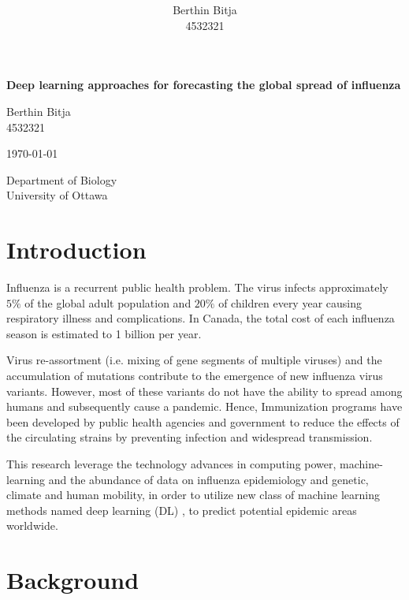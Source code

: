 \documentclass[12pt]{article}
\title{ }
\author{Berthin Bitja \\ 4532321}
\date{}
\begin{document}
\begin{titlepage}
	\centering

	{\Large\bfseries Deep learning approaches for forecasting the global spread of influenza \par}
	\vspace{2cm}
	{\small Berthin Bitja \\ 4532321 \par}
	{\small \today\par}
	\vfill
	
	{\large Department of Biology \\ University of Ottawa \par}


\end{titlepage}

\newpage

\tableofcontents

\newpage

\section{Introduction}
Influenza is a recurrent public health problem. The virus infects approximately $5\%$ of the global adult population and $20\%$ of children every year causing respiratory illness and complications\autocite{Ting2017}. In Canada, the total cost of each influenza season is estimated to 1 billion per year\autocite{Molinari2007}. 

Virus re-assortment (i.e. mixing of gene segments of multiple viruses) and the accumulation of mutations contribute to the emergence of new influenza virus variants. However, most of these variants do not have the ability to spread among humans and subsequently cause a pandemic. Hence, Immunization programs have been developed by public health agencies and government to reduce the effects of the circulating strains by preventing infection and widespread transmission\autocite{Jefferson2005}. 

This research leverage the technology advances in computing power, machine-learning and the abundance of data on influenza epidemiology and genetic, climate and human mobility, in order to utilize new class of machine learning methods named deep learning (DL) , to predict potential epidemic areas worldwide.

\section{Background}
\end{document}
